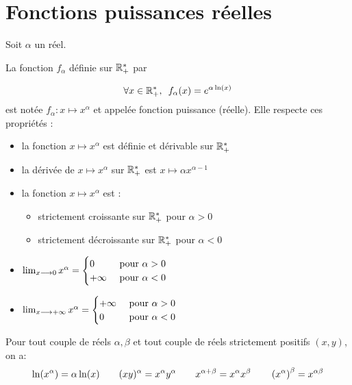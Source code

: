 \section{Fonctions puissances réelles}
\begin{defi}
    Soit \(\alpha\) un réel.

    La fonction \(f_{\alpha}\) définie sur \(\mathbb{R}_+^*\) par 

    \[\quantifs{\forall x \in \Rps} f_{\alpha}(x) = e^{\alpha \ln(x)} \]
    est notée \(f_{\alpha}: x \mapsto x^{\alpha}\) et appelée fonction puissance (réelle). Elle respecte ces propriétés : 
    \begin{itemize}
        \item la fonction \(x\mapsto x^{\alpha}\) est définie et dérivable sur \(\mathbb{R}_+^*\)
        \item la dérivée de \(x\mapsto x^{\alpha}\) sur \(\mathbb{R}_+^*\) est \(x\mapsto \alpha x^{\alpha-1}\)
        \item la fonction \(x\mapsto x^{\alpha}\) est : 
        \begin{itemize}
            \item strictement croissante sur \(\mathbb{R}_+^*\) pour \(\alpha > 0 \) 
            \item strictement décroissante  sur \(\mathbb{R}_+^*\) pour \(\alpha < 0 \) 
        \end{itemize}
        \item  \(\lim_{x\longrightarrow 0} x^{\alpha} = \begin{cases}
            0 &\text{ pour } \alpha >0 \\
            +\infty &\text{ pour } \alpha <0
        \end{cases}\)
        \item  
        \(\lim_{x\longrightarrow +\infty} x^{\alpha} = 
        \begin{cases}
            +\infty &\text{ pour } \alpha >0 \\
             0 &\text{ pour } \alpha <0
        \end{cases}
        \)
    \end{itemize}
\end{defi}

\begin{prop}
    Pour tout couple de réels \(\alpha,\beta\) et tout couple de réels strictement positifs \((x,y)\), on a:
    \[\ln(x^{\alpha}) = \alpha \ln(x) \qquad (xy)^{\alpha} = x^{\alpha}y^{\alpha} \qquad x^{\alpha+\beta} = x^{\alpha}x^{\beta} \qquad \left(x^{\alpha}\right)^{\beta} = x^{\alpha \beta}\]
\end{prop}

